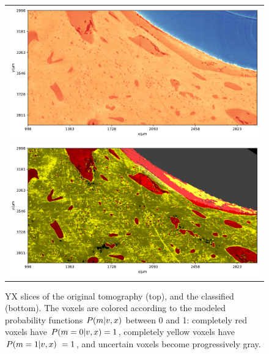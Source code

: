 \begin{figure}
    \centering
    \begin{tabular}{c}
        \includegraphics[width=.95\linewidth]{generated/770c_pag_segmented_yx_raw.pdf} \\
        \includegraphics[width=.95\linewidth]{generated/770c_pag_segmented_yx_colored.pdf}
    \end{tabular}
    \caption{
        YX slices of the original tomography (top), and the classified
        (bottom). The voxels are colored according to the modeled probability
        functions $P(m\vert v,x)$ between 0 and 1: completely red voxels
        have $P(m=0\vert v,x) = 1$, completely yellow voxels have
        $P(m=1\vert v,x)\ = 1$, and uncertain voxels become progressively
        gray.
    }
    \label{fig:histology-comparison1}
\end{figure}

